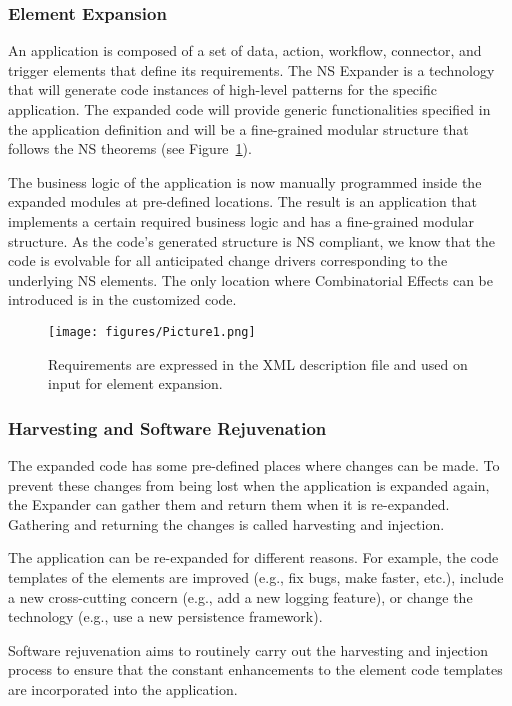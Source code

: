 \subsubsection{Element Expansion}\label{Element Expansion} An application is composed of a
set of data, action, workflow, connector, and trigger elements that define its
requirements. The NS Expander is a technology that will generate code instances of
high-level patterns for the specific application. The expanded code will provide generic
functionalities specified in the application definition and will be a fine-grained modular
structure that follows the NS theorems (see Figure~\ref{fig_1}).

The business logic of the application is now manually programmed inside the expanded
modules at pre-defined locations. The result is an application that implements a certain
required business logic and has a fine-grained modular structure. As the code's generated
structure is NS compliant, we know that the code is evolvable for all anticipated change
drivers corresponding to the underlying NS elements. The only location where Combinatorial
Effects can be introduced is in the customized code.
\begin{figure}[htbp]
\centering
\centerline{\texttt{[image: figures/Picture1.png]}}
\caption{Requirements are expressed in the XML description file and used on input for element expansion.}
\label{fig_1}
\end{figure}

%
%
\subsubsection{Harvesting and Software Rejuvenation}\label{Harvesting and Software
Rejuvenation} The expanded code has some pre-defined places where changes can be made. To
prevent these changes from being lost when the application is expanded again, the Expander
can gather them and return them when it is re-expanded. Gathering and returning the
changes is called harvesting and injection.

The application can be re-expanded for different reasons. For example, the code templates
of the elements are improved (e.g., fix bugs, make faster, etc.), include a new cross-cutting
concern (e.g., add a new logging feature), or change the technology (e.g., use a new persistence
framework).

Software rejuvenation aims to routinely carry out the harvesting and injection process to
ensure that the constant enhancements to the element code templates are incorporated into
the application.

